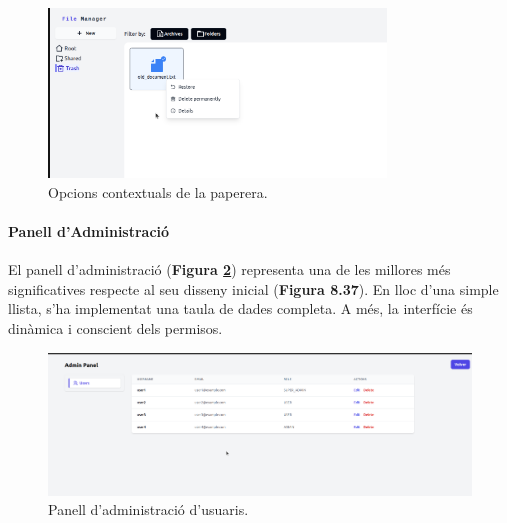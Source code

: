 \begin{figure}[H]
    \centering
    \includegraphics[width=0.8\textwidth]{Figures/ui-web/trash_section.png}
    \caption{Opcions contextuals de la paperera.}
    \label{fig:react-trash-impl}
\end{figure}


\paragraph{Panell d'Administració}
El panell d'administració (\textbf{Figura \ref{fig:react-admin-impl}}) representa una de les millores més significatives respecte al seu disseny inicial (\textbf{Figura 8.37}). En lloc d'una simple llista, s'ha implementat una taula de dades completa. A més, la interfície és dinàmica i conscient dels permisos.

\begin{figure}[H]
    \centering
    \includegraphics[width=\textwidth]{Figures/ui-web/admin_panel.png}
    \caption{Panell d'administració d'usuaris.}
    \label{fig:react-admin-impl}
\end{figure}

